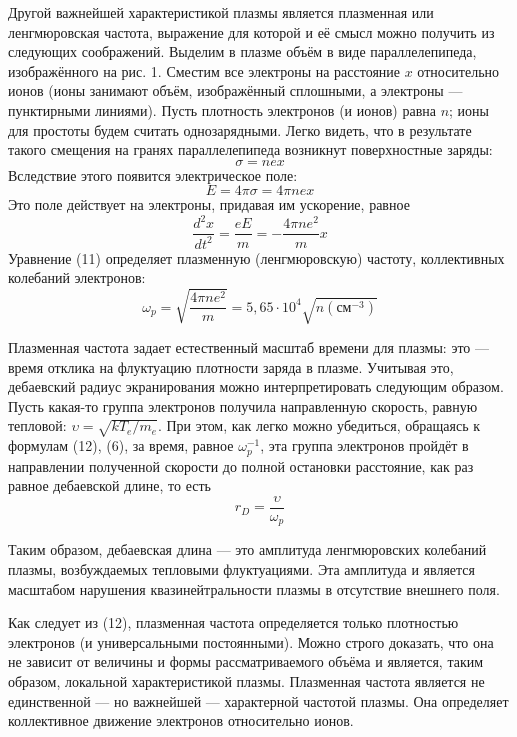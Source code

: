 Другой важнейшей характеристикой плазмы
является плазменная или ленгмюровская
частота, выражение для которой и её
смысл можно получить из следующих
соображений. Выделим в плазме объём в
виде параллелепипеда, изображённого на
рис. 1. Сместим все электроны на
расстояние $x$ относительно ионов (ионы
занимают объём, изображённый сплошными,
а электроны — пунктирными линиями).
Пусть плотность электронов (и ионов)
равна $n$; ионы для простоты будем считать
однозарядными. Легко видеть, что в
результате такого смещения на гранях
параллелепипеда возникнут поверхностные
заряды:
\begin{equation}
    \sigma = n e x
\end{equation}
Вследствие этого появится электрическое
поле:
\begin{equation}
    E=4 \pi \sigma = 4\pi n e x
\end{equation}
Это поле действует на электроны,
придавая им ускорение, равное 
\begin{equation}
    \frac{d^2x}{dt^2} = \frac{eE}{m} = - 
    \frac{4\pi n e^2}{m}x
\end{equation}
Уравнение (11) определяет плазменную
(ленгмюровскую) частоту, коллективных
колебаний электронов:
\begin{equation}
    \omega_p = \sqrt{\frac{4\pi n
    e^2}{m}} = 5,65\cdot 10^4
    \sqrt{n(\text{см}^{-3})}
\end{equation}

Плазменная частота задает естественный
масштаб времени для плазмы: это — время
отклика на флуктуацию плотности заряда в
плазме. Учитывая это, дебаевский радиус
экранирования можно интерпретировать
следующим образом. Пусть какая-то группа
электронов получила направленную
скорость, равную тепловой: $\upsilon =
\sqrt{k T_e/m_e}$.
При этом, как легко можно убедиться,
обращаясь к формулам (12), (6), за
время, равное $\omega_p^{-1}$, эта группа
электронов пройдёт в направлении
полученной скорости до полной остановки
расстояние, как раз равное дебаевской
длине, то есть
\begin{equation}
    r_D = \frac{\upsilon}{\omega_p}    
\end{equation}

Таким образом, дебаевская длина — это
амплитуда ленгмюровских колебаний
плазмы, возбуждаемых тепловыми
флуктуациями. Эта амплитуда и является
масштабом нарушения квазинейтральности
плазмы в отсутствие внешнего поля.

Как следует из (12), плазменная
частота определяется только плотностью
электронов (и универсальными
постоянными). Можно строго доказать, что
она не зависит от величины и формы
рассматриваемого объёма и является,
таким образом, локальной характеристикой
плазмы. Плазменная частота является не
единственной — но важнейшей —
характерной частотой плазмы. Она
определяет коллективное движение
электронов относительно ионов.

